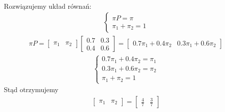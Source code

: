 \documentclass[12pt]{article}
\begin{document}
\begin{enumerate}
\begin{align*}
        \end{align*}
        Rozwiązujemy układ równań:
        \begin{align*}
            \left\{\begin{matrix}
                       \pi P = \pi\\
                       \pi_1 + \pi_2 = 1
            \end{matrix}\right.
        \end{align*}
        \begin{align*}
            \pi P =
            \begin{bmatrix}
                \pi_1 & \pi_2
            \end{bmatrix}
            \begin{bmatrix}
                0.7 & 0.3\\
                0.4 & 0.6
            \end{bmatrix}
            =
            \begin{bmatrix}
                0.7\pi_1 + 0.4\pi_2 & 0.3\pi_1 + 0.6\pi_2
            \end{bmatrix}
        \end{align*}
        \begin{align*}
            \left\{\begin{matrix}
                       0.7\pi_1 + 0.4\pi_2 = \pi_1\\
                       0.3\pi_1 + 0.6\pi_2 = \pi_2\\
                       \pi_1 + \pi_2 = 1
            \end{matrix}\right.
        \end{align*}
        Stąd otrzymujemy
        \begin{align*}
            \begin{bmatrix}
                \pi_1 & \pi_2
            \end{bmatrix}
            =
            \begin{bmatrix}
                \frac{4}{7} & \frac{3}{7}
            \end{bmatrix}
        \end{align*}
    \end{enumerate}
    \newpage
\end{document}
